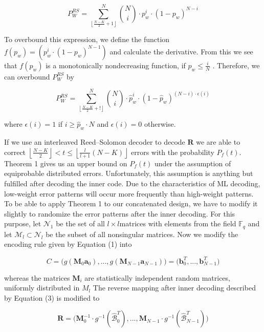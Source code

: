 \documentclass[fontsize=12pt]{article}
\begin{document}
\begin{equation}
P_W^{RS} = \sum_{ \left \lfloor \frac{N-K}{2}+1 \right \rfloor }^{N}\binom{N}{i}\cdot p_w^i\cdot(1-p_w)^{N-i}
\end{equation}

To overbound this expression, we define the function$f(p_w) = (p_w^i \cdot (1-p_w)^{N-1} )$
 and calculate the derivative.
From this we see that $f(p_w)$  is a monotonically nondecreasing
function, if $p_w \leq \frac{i}{N}$ . Therefore, we can overbound
$P_W^{RS}$ by

\begin{equation}
P_W^{RS} = \sum_{ \left \lfloor \frac{N-K}{2}+! \right \rfloor }^{N}\binom{N}{i}\cdot \hat{p}_w^i\cdot(1-\hat{p}_w)^{(N-i)\cdot \epsilon(i) }
\end{equation}

where $\epsilon(i) = 1$ if $i \geq \hat{p}_w\cdot N$ and $\epsilon(i) = 0$ otherwise.

If we use an interleaved Reed–Solomon decoder to decode
$\mathbf{R}$ we are able to correct $ \left \lfloor \frac{N-K}{2} \right \rfloor < t \leq  \left \lfloor \frac{l}{l+1} ({N - K}) \right \rfloor$ errors
with the probability 
$P_f(t)$. Theorem 1 gives us an upper bound
on 
$P_f(t)$ under the assumption of equiprobable distributed
errors. Unfortunately, this assumption is anything but fulfilled
after decoding the inner code. Due to the characteristics of ML
decoding, low-weight error patterns will occur more frequently
than high-weight patterns. To be able to apply Theorem 1
to our concatenated design, we have to modify it slightly to
randomize the error patterns after the inner decoding. For this
purpose, let $\mathcal{N}_1$ be the set of all $l \times l$matrices with elements
from the field $\mathbb{F}_q$ and let $\mathcal{M}_l \subset \mathcal{N}_l$ be the subset of all nonsingular
matrices. Now we modify the encoding rule given by
Equation (1) into

$$
C=\Big( g(\mathbf{M}_0\textbf{a}_0),...,g(\mathbf{M}_{N-1}\textbf{a}_{N-1})\Big) = \Big( \textbf{b}_0^T,...,\textbf{b}_{N-1}^T\Big)$$

whereas the matrices
$\mathbf{M}_i$ are statistically independent random
matrices, uniformly distributed in $M_l$ The reverse mapping
after inner decoding described by Equation (3) is modified to

$$\mathbf{R}=\Big(\mathbf{M}_0^{-1} \cdot g^{-1}(\hat{\mathcal{B}}^T_0),...,\mathbf{M}_{N-1}\cdot g^{-1}(\hat{\mathcal{B}}^T_{N-1})\Big) $$
\end{document}
